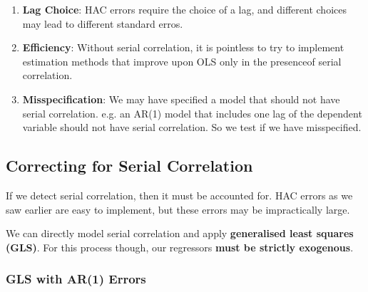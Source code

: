 \documentclass[11pt]{article}
\begin{document}
\begin{shaded}
    \begin{enumerate}
        \item \textbf{Lag Choice}: HAC errors require the choice of a lag, and different choices may lead to different standard erros.

        \item \textbf{Efficiency}: Without serial correlation, it is pointless to try to implement estimation methods that improve upon OLS only in the presenceof serial correlation.

        \item \textbf{Misspecification}: We may have specified a model that should not have serial correlation. e.g. an AR(1) model that includes one lag of the dependent variable should not have serial correlation. So we test if we have misspecified.
    \end{enumerate}
\end{shaded}

\subsection{Correcting for Serial Correlation}

If we detect serial correlation, then it must be accounted for. HAC errors as we saw earlier are easy to implement, but these errors may be impractically large.

We can directly model serial correlation and apply \textbf{generalised least squares (GLS)}. For this process though, our regressors \textbf{must be strictly exogenous}.

\subsubsection{GLS with AR(1) Errors}
\end{document}
